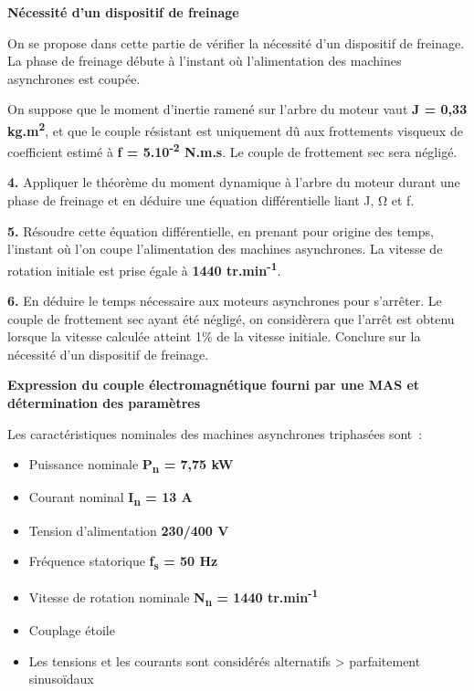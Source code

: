 \textbf{Nécessité d'un dispositif de freinage}

On se propose dans cette partie de vérifier la nécessité d'un dispositif de freinage. La phase de freinage débute à l'instant où l'alimentation des machines asynchrones est coupée.

On suppose que le moment d'inertie ramené sur l'arbre du moteur vaut \textbf{J = 0,33 kg.m\textsuperscript{2}}, et que le couple résistant est uniquement dû aux frottements visqueux de coefficient estimé à \textbf{f = 5.10\textsuperscript{-2} N.m.s}. Le couple de frottement sec sera négligé.

\textbf{4.} Appliquer le théorème du moment dynamique à l'arbre du moteur durant une phase de freinage et en déduire une équation différentielle liant J, Ω et f.

\textbf{5.} Résoudre cette équation différentielle, en prenant pour origine des temps, l'instant où l'on coupe l'alimentation des machines asynchrones. La vitesse de rotation initiale est prise égale à \textbf{1440 tr.min\textsuperscript{-1}}.

\textbf{6.} En déduire le temps nécessaire aux moteurs asynchrones pour s'arrêter. Le couple de frottement sec ayant été négligé, on considèrera que l'arrêt est obtenu lorsque la vitesse calculée atteint 1\% de la vitesse initiale. Conclure sur la nécessité d'un dispositif de freinage.

\textbf{Expression du couple électromagnétique fourni par une MAS et détermination des paramètres}

Les caractéristiques nominales des machines asynchrones triphasées sont~:

\begin{itemize}
\item
  Puissance nominale \textbf{P\textsubscript{n} = 7,75 kW}
\item
  Courant nominal \textbf{I\textsubscript{n} = 13 A}
\item
  Tension d'alimentation \textbf{230/400 V}
\item
  Fréquence statorique \textbf{f\textsubscript{s} = 50 Hz}
\item
  Vitesse de rotation nominale \textbf{N\textsubscript{n} = 1440 tr.min\textsuperscript{-1}}
\item
  Couplage étoile
\item
  Les tensions et les courants sont considérés alternatifs \textgreater{} parfaitement sinusoïdaux
\end{itemize}

